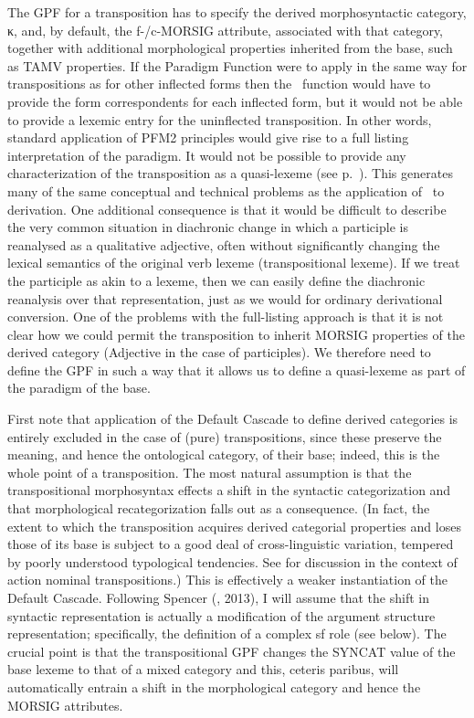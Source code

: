 \documentclass[output=paper,
modfonts
]{LSP/langsci}
\begin{document}
The GPF for a transposition has to specify the derived morphosyntactic category, κ, and, by default, the f-/c-MORSIG attribute, associated with that category, together with additional morphological properties inherited from the base, such as TAMV properties. If the Paradigm Function were to apply in the same way for transpositions as for other inflected forms then the \Corrfn\ function would have to provide the form correspondents for each inflected form, but it would not be able to provide a lexemic entry for the uninflected transposition. In other words, standard application of PFM2 principles would give rise to a full listing interpretation of the paradigm. It would not be possible to provide any characterization of the transposition as a quasi-lexeme (see p.~\pageref{quasilexeme}). %
This generates many of the same conceptual and technical problems as the application of \Corrfn\ to derivation. %
One additional consequence  is that  it would be difficult to describe the very common situation in diachronic change in which a participle is reanalysed as a qualitative adjective, often without significantly changing the lexical semantics of the original verb lexeme (transpositional lexeme). If we treat the participle as akin to a lexeme, then we can easily define the diachronic reanalysis over that representation, just as we would for ordinary derivational conversion. 
One of the problems with the full-listing approach is that it is not clear how we could  permit the transposition to inherit  MORSIG properties of the derived  category (Adjective in the case of participles). We therefore need to define the GPF in such a way that it allows us to define a quasi-lexeme as part of the paradigm of the base.

First note that application of the Default Cascade to define derived categories is entirely excluded in the case of (pure) transpositions, since these preserve the meaning, and hence the ontological category, of their base; indeed, this is the whole point of a transposition. The most natural assumption is that  the transpositional morphosyntax effects a shift in the syntactic categorization and that morphological recategorization falls out as a consequence. (In fact, the extent to which the transposition acquires derived categorial properties and loses those of its base is subject to a good deal of cross-linguistic variation, tempered by poorly understood typological tendencies. See \textcite{Malchukov04:book} for discussion in the context of  action nominal transpositions.) This is effectively a weaker instantiation of the Default Cascade.  Following Spencer (\citeyear*{Spencer99:transpositions}, 2013), I will assume that the shift in syntactic representation is actually a modification of the argument structure representation; %
specifically, the definition of a complex sf role (see below). %
 The crucial point is  that the transpositional GPF changes the SYNCAT value of the base lexeme to that of a mixed category and  this, ceteris paribus, will automatically entrain a shift in the morphological category and hence the MORSIG attributes. 
\end{document}
